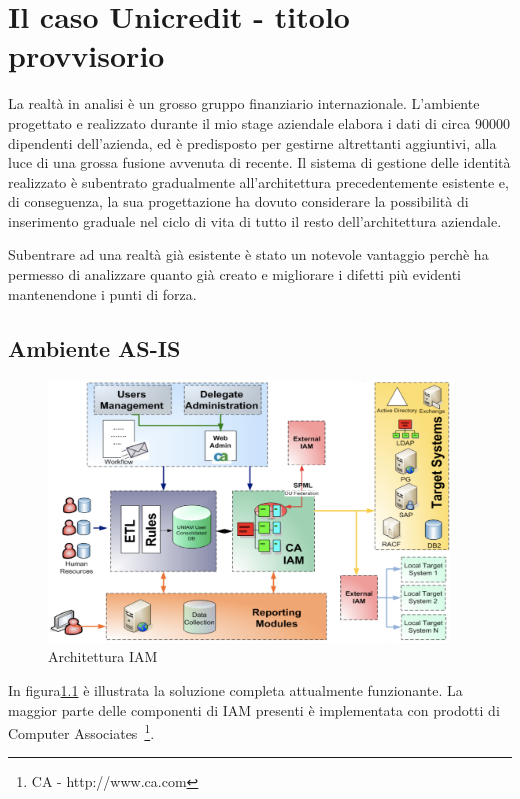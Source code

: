 \chapter{Il caso Unicredit - titolo provvisorio} 

La realtà in analisi è un grosso gruppo finanziario internazionale. L'ambiente
progettato e realizzato durante il mio stage aziendale elabora i
dati di circa 90000 dipendenti dell'azienda, ed è predisposto per gestirne
altrettanti aggiuntivi, alla luce di una grossa fusione avvenuta di recente.
Il sistema di gestione delle identità realizzato è subentrato gradualmente
all'architettura precedentemente esistente e, di conseguenza, la sua
progettazione ha dovuto considerare la possibilità di
inserimento graduale nel ciclo di vita di tutto il resto dell'architettura
aziendale.

Subentrare ad una realtà già esistente è stato un notevole vantaggio perchè ha
permesso di analizzare quanto già creato e migliorare i difetti più evidenti
mantenendone i punti di forza.

\section{Ambiente AS-IS}

\begin{figure}
\centering
\includegraphics[width=0.95\textwidth]{img/soluzioneCA.eps}
\caption{Architettura IAM}
\label{soluzioneCA}
\end{figure}

In figura\ref{soluzioneCA} è illustrata la soluzione completa attualmente
funzionante. La maggior parte delle componenti di IAM presenti è implementata
con prodotti di Computer Associates~\footnote{CA - http://www.ca.com}.

